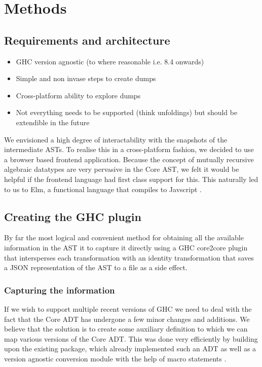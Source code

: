 \chapter{Methods}

\section{Requirements and architecture}

\begin{itemize}
  \item GHC version agnostic (to where reasonable i.e. 8.4 onwards)
  \item Simple and non invase steps to create dumps
  \item Cross-platform ability to explore dumps
  \item Not everything needs to be supported (think unfoldings) but should be extendible in the future
\end{itemize}

We envisioned a high degree of interactability with the snapshots of the intermediate ASTs. To realise this
in a cross-platform fashion, we decided to use a browser based frontend application. Because the concept of
mutually recursive algebraic datatypes are very pervasive in the Core AST, we felt it would be helpful
if the frontend language had first class support for this. This naturally led to us to Elm, a functional language
that compiles to Javscript \cite{elm_lang}.

\section{Creating the GHC plugin}

By far the most logical and convenient method for obtaining all the available information in the AST it to capture
it directly using a GHC core2core plugin that intersperses each transformation with an identity transformation that
saves a JSON representation of the AST to a file as a side effect. 

\subsection{Capturing the information}

If we wish to support multiple recent versions of GHC we need to deal with the fact that the Core ADT has undergone
a few minor changes and additions. We believe that the solution is to create some auxiliary definition to which we can
map various versions of the Core ADT. This was done very efficiently by building upon the existing  package,
which already implemented such an ADT as well as a version agnostic conversion module with the help of 
macro statements \cite{ghc_dump}. 

